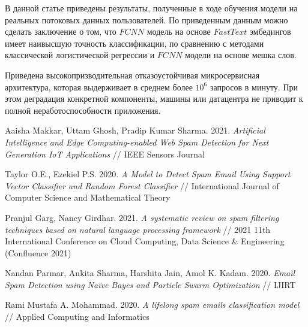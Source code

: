 \documentclass[12pt]{article}
\begin{document}
В данной статье приведены результаты, полученные в ходе обучения модели на реальных потоковых данных пользователей. По приведенным данным можно сделать заключение о том, что $FCNN$ модель на основе $Fast Text$ эмбедингов имеет наивысшую точность классификации, по сравнению с методами классической логистической регрессии и $FCNN$ модели на основе мешка слов.


Приведена высокопризводительная отказоустойчивая микросервисная архитектура, которая выдерживает в среднем более $10^6$ запросов в минуту. При этом деградация конкретной компоненты, машины или датацентра не приводит к полной неработоспособности приложения.

\begin{thebibliography}{99}
Aaisha Makkar, Uttam Ghosh, Pradip Kumar Sharma.
2021. \emph{Artificial Intelligence and Edge Computing-enabled
	Web Spam Detection for Next Generation IoT
	Applications} // IEEE Sensors Journal

Taylor O.E., Ezekiel P.S.
2020. \emph{A Model to Detect Spam Email Using Support Vector Classifier and Random Forest Classifier} //
International Journal of Computer Science and Mathematical Theory

Pranjul Garg, Nancy Girdhar.
2021. \emph{A systematic review on spam filtering techniques based on
natural language processing framework} // 2021 11th International Conference on Cloud Computing, Data Science \& Engineering (Confluence 2021)

Nandan Parmar, Ankita Sharma, Harshita Jain, Amol K. Kadam.
2020. \emph{Email Spam Detection using Naïve Bayes and Particle Swarm Optimization} // IJIRT

Rami Mustafa A. Mohammad.
2020. \emph{A lifelong spam emails 	classification model} //
Applied Computing and Informatics
\end{thebibliography}
\end{document}
